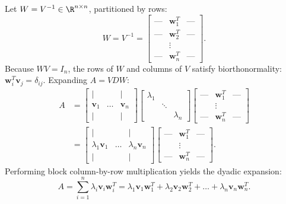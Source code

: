 Let $W = V^{-1} \in \R^{n \times n}$, partitioned by rows:
\begin{equation}
    W = V^{-1} = \begin{bmatrix} \text{---} & \mathbf{w}_1^T & \text{---} \\ \text{---} & \mathbf{w}_2^T & \text{---} \\ & \vdots & \\ \text{---} & \mathbf{w}_n^T & \text{---} \end{bmatrix}.
\end{equation}
Because $W V = I_n$, the rows of $W$ and columns of $V$ satisfy biorthonormality: $\mathbf{w}_i^T \mathbf{v}_j = \delta_{ij}$. Expanding $A = V D W$:
\begin{align}
    A &= \begin{bmatrix} \mid & & \mid \\ \mathbf{v}_1 & \dots & \mathbf{v}_n \\ \mid & & \mid \end{bmatrix} \begin{bmatrix} \lambda_1 & & \\ & \ddots & \\ & & \lambda_n \end{bmatrix} \begin{bmatrix} \text{---} & \mathbf{w}_1^T & \text{---} \\ & \vdots & \\ \text{---} & \mathbf{w}_n^T & \text{---} \end{bmatrix} \nonumber \\
    &= \begin{bmatrix} \mid & & \mid \\ \lambda_1 \mathbf{v}_1 & \dots & \lambda_n \mathbf{v}_n \\ \mid & & \mid \end{bmatrix} \begin{bmatrix} \text{---} & \mathbf{w}_1^T & \text{---} \\ & \vdots & \\ \text{---} & \mathbf{w}_n^T & \text{---} \end{bmatrix}.
\end{align}
Performing block column-by-row multiplication yields the dyadic expansion:
\begin{equation}
    A = \sum_{i=1}^n \lambda_i \mathbf{v}_i \mathbf{w}_i^T = \lambda_1 \mathbf{v}_1 \mathbf{w}_1^T + \lambda_2 \mathbf{v}_2 \mathbf{w}_2^T + \dots + \lambda_n \mathbf{v}_n \mathbf{w}_n^T.
\end{equation}

